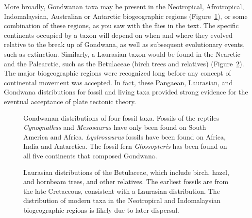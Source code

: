 \documentclass[11pt, hidelinks]{article}
\begin{document}
More broadly, Gondwanan taxa may be present in the Neotropical, Afrotropical, Indomalaysian, Australian or Antarctic biogeographic regions (Figure~\ref{Gondwana Distributions}), or some combination of these regions, as you saw with the flies in the text. The specific continents occupied by a taxon will depend on when and where they evolved relative to the break up of Gondwana, as well as subsequent evolutionary events, such as extinction.  Similarly, a Laurasian taxon would be found in the Nearctic and the Palearctic, such as the Betulaceae (birch trees and relatives) (Figure~\ref{Betulaceae Map}). The major biogeographic regions were recognized long before any concept of continental movement was accepted.  In fact, these Pangaean, Laurasian, and Gondwana distributions for fossil and living taxa provided strong evidence for the eventual acceptance of plate tectonic theory. 

\begin{figure}[tb]
	\centering
		\caption{Gondwanan distributions of four fossil taxa. Fossils of the reptiles \emph{Cynognathus} and \emph{Mesosaurus} have only been found on South America and Africa. \emph{Lystrosaurus} fossils have been found on Africa, India and Antarctica. The fossil fern \emph{Glossopteris} has been found on all five continents that composed Gondwana.\label{Gondwana Distributions}}
		
\end{figure}

\begin{figure}[tb]
	\centering
		\caption{Laurasian distributions of the Betulaceae, which include birch, hazel, and hornbeam trees, and other relatives. The earliest fossils are from the late Cretaceous, consistent with a Laurasian distribution. The distribution of modern taxa in the Neotropical and Indomalaysian biogeographic regions is likely due to later dispersal.\label{Betulaceae Map}}
		
\end{figure}
 
\end{document}
